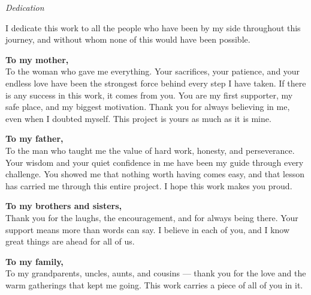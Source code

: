 
\thispagestyle{empty}
\vspace*{1cm}

\begin{center}
{\Large\itshape Dedication}
\end{center}

\vspace{1cm}

\noindent I dedicate this work to all the people who have been by my side throughout this journey, and without whom none of this would have been possible.

\vspace{0.6cm}

\noindent\textbf{To my mother,}\\
To the woman who gave me everything. Your sacrifices, your patience, and your endless love have been the strongest force behind every step I have taken. If there is any success in this work, it comes from you. You are my first supporter, my safe place, and my biggest motivation. Thank you for always believing in me, even when I doubted myself. This project is yours as much as it is mine.

\vspace{0.6cm}

\noindent\textbf{To my father,}\\
To the man who taught me the value of hard work, honesty, and perseverance. Your wisdom and your quiet confidence in me have been my guide through every challenge. You showed me that nothing worth having comes easy, and that lesson has carried me through this entire project. I hope this work makes you proud.

\vspace{0.6cm}

\noindent\textbf{To my brothers and sisters,}\\
Thank you for the laughs, the encouragement, and for always being there. Your support means more than words can say. I believe in each of you, and I know great things are ahead for all of us.

\vspace{0.6cm}

\noindent\textbf{To my family,}\\
To my grandparents, uncles, aunts, and cousins --- thank you for the love and the warm gatherings that kept me going. This work carries a piece of all of you in it.

